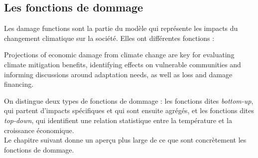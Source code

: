 \subsection{Les fonctions de dommage}
\label{sect:1.3.3}

Les \glspl{damage function} sont la partie du modèle qui représente les impacts du changement climatique sur la société. Elles ont différentes fonctions : 

\begin{authoredquote}
    Projections of economic damage from climate change are key for evaluating climate mitigation benefits, identifying effects on vulnerable communities and informing discussions around adaptation needs, as well as loss and damage financing. 
\end{authoredquote}

On distingue deux types de fonctions de dommage : les fonctions dites \emph{bottom-up}, qui partent d'impacts spécifiques et qui sont ensuite agrégés, et les fonctions dites \emph{top-down}, qui identifient une relation statistique entre la température et la croissance économique. \\

Le chapitre suivant donne un aperçu plus large de ce que sont concrètement les fonctions de dommage. 





